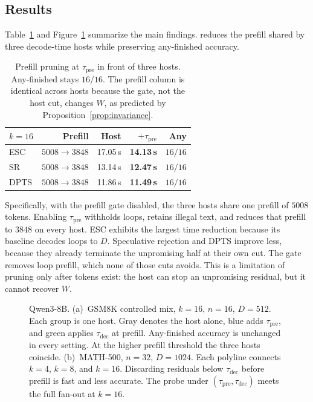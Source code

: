 \subsection{Results}
\label{sec:analysis}

Table~\ref{tab:hosts} and Figure~\ref{fig:results} summarize the main findings.
\sys reduces the prefill shared by three decode-time hosts while preserving any-finished accuracy.

\begin{table}[t]
\centering
\small
\setlength{\tabcolsep}{4pt}
\begin{tabular}{@{}lrrrr@{}}
\toprule
$k{=}16$ & Prefill & Host & $+\tau_{\mathrm{pre}}$ & Any \\
\midrule
ESC & $5008 \to 3848$ & 17.05\,s & \textbf{14.13\,s} & $16/16$ \\
SR & $5008 \to 3848$ & 13.14\,s & \textbf{12.47\,s} & $16/16$ \\
DPTS & $5008 \to 3848$ & 11.86\,s & \textbf{11.49\,s} & $16/16$ \\
\bottomrule
\end{tabular}
\caption{Prefill pruning at $\tau_{\mathrm{pre}}$ in front of three hosts.
Any-finished stays $16/16$.
The prefill column is identical across hosts because the gate, not the host cut, changes $W$, as predicted by Proposition~\ref{prop:invariance}.}
\label{tab:hosts}
\end{table}

Specifically, with the prefill gate disabled, the three hosts share one prefill of $5008$ tokens.
Enabling $\tau_{\mathrm{pre}}$ withholds loops, retains illegal text, and reduces that prefill to $3848$ on every host.
ESC exhibits the largest time reduction because its baseline decodes loops to $D$.
Speculative rejection and DPTS improve less, because they already terminate the unpromising half at their own cut.
The gate removes loop prefill, which none of those cuts avoids.
This is a limitation of pruning only after tokens exist: the host can stop an unpromising residual, but it cannot recover $W$.

\begin{figure}[t]
\centering
\resizebox{\textwidth}{!}{}
\caption{Qwen3-8B.
(a)~GSM8K controlled mix, $k{=}16$, $n{=}16$, $D{=}512$.
Each group is one host.
Gray denotes the host alone, blue adds $\tau_{\mathrm{pre}}$, and green applies $\tau_{\mathrm{dec}}$ at prefill.
Any-finished accuracy is unchanged in every setting.
At the higher prefill threshold the three hosts coincide.
(b)~MATH-500, $n{=}32$, $D{=}1024$.
Each polyline connects $k{=}4$, $k{=}8$, and $k{=}16$.
Discarding residuals below $\tau_{\mathrm{dec}}$ before prefill is fast and less accurate.
The probe under $(\tau_{\mathrm{pre}}, \tau_{\mathrm{dec}})$ meets the full fan-out at $k{=}16$.}
\label{fig:results}
\end{figure}

